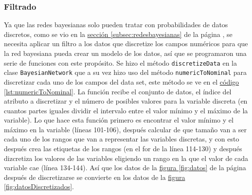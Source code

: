 \subsubsection{Filtrado}
\label{sec:filtrado}
Ya que las redes bayesianas solo pueden tratar con probabilidades de datos discretos, como se vio en la 
\hyperref[subsec:redesbayesianas]{ sección \ref{subsec:redesbayesianas}} de la página \pageref{subsec:redesbayesianas}, se necesita aplicar un filtro a los datos que discretize los campos numéricos para que la red bayesiana pueda crear un modelo de los datos, así que se programaron una serie de funciones con este propósito. Se hizo el método \texttt{discretizeData} en la clase \texttt{BayesianNetwork} que a su vez hizo uso del método \texttt{numericToNominal} para discretizar cada uno de los campos del data set, este método se ve en el  \hyperref[lst:numericToNominal]{código \ref{lst:numericToNominal}}.
La función recibe el conjunto de datos, el índice del atributo a discretizar y el número de posibles valores para la variable discreta (en cuantos partes iguales dividir el intervalo entre el valor mínimo y el máximo de la variable).
Lo que hace esta función primero es encontrar el valor mínimo y el máximo en la variable (líneas 101-106), después calcular de que tamaño van a ser cada uno de los rangos que van a representar las variables discretas, y con esto después crea las etiquetas de los rangos (en el for de la línea 114-130) y después dizcretiza los valores de las variables eligiendo un rango en la que el valor de cada variable cae (línea 134-144).
Así que los datos de la \hyperref[fig:datos]{figura \ref{fig:datos}} de la página \pageref{fig:datos} después de discretizarse se convierte en los datos de la \hyperref[fig:datosDiscretizados]{figura \ref{fig:datosDiscretizados}}. 


